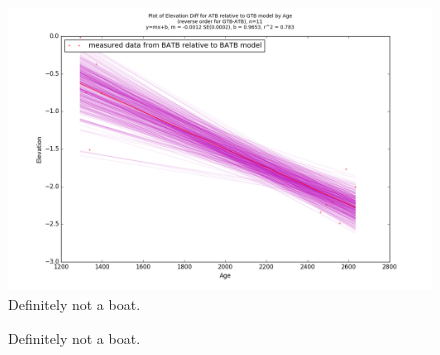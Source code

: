\begin{figure}[h]
	\includegraphics[width=\linewidth]{data/gias/theGIA_ATB_relative_to_GTB.png}
	\caption{Definitely not a boat.}
	\label{fig:gias_ATBxGTB}
\end{figure}
\newpage










\begin{figure}[h]
	\caption{Definitely not a boat.}
	\label{fig:data_GTBxTAHB}
\end{figure}
\newpage

